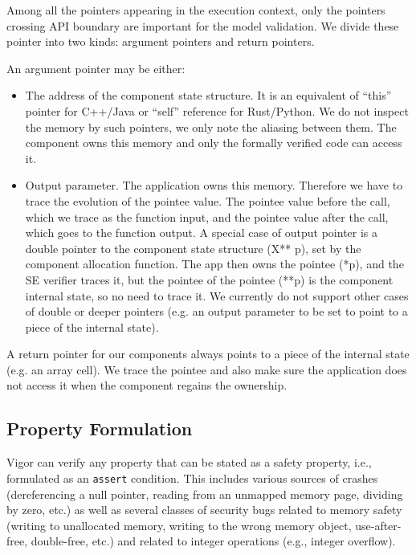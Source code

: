\documentclass[letterpaper,twocolumn,10pt]{article}
\newcommand{\code}[1]{\lstinline{#1}}
\begin{document}
Among all the pointers appearing in the execution context, only the pointers crossing API boundary are important for the model validation. We divide these pointer into two kinds: argument pointers and return pointers.

An argument pointer may be either:
\begin{itemize}
    \item The address of the component state structure. It is an equivalent of ``this'' pointer for C++/Java or ``self'' reference for Rust/Python. We do not inspect the memory by such pointers, we only note the aliasing between them. The component owns this memory and only the formally verified code can access it.
    \item Output parameter. The application owns this memory. Therefore we have to trace the evolution of the pointee value. The pointee value before the call, which we trace as the function input, and the pointee value after the call, which goes to the function output. A special case of output pointer is a double pointer to the component state structure (X** p), set by the component allocation function. The app then owns the pointee (*p), and the SE verifier traces it, but the pointee of the pointee (**p) is the component internal state, so no need to trace it. We currently do not support other cases of double or deeper pointers (e.g. an output parameter to be set to point to a piece of the internal state).
\end{itemize}

A return pointer for our components always points to a piece of the internal state (e.g. an array cell). We trace the pointee and also make sure the application does not access it when the component regains the ownership.

\subsection{Property Formulation}
\label{sec:properties}

Vigor can verify any property that can be stated as a safety property, i.e., formulated as an \code{assert} condition. This includes various sources of crashes (dereferencing a null pointer, reading from an unmapped memory page, dividing by zero, etc.) as well as several classes of security bugs related to memory safety (writing to unallocated memory, writing to the wrong memory object, use-after-free, double-free, etc.) and related to integer operations (e.g., integer overflow).
\end{document}
